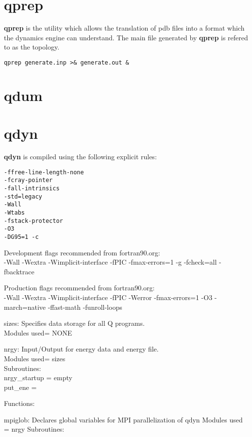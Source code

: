 \documentclass[10pt, oneside, pdftex]{article}
\begin{document}
\section{qprep}
\label{qprep}
\textbf{qprep} is the utility which allows the translation of pdb files into
a format which the dynamics engine can understand. The main file generated
by \textbf{qprep} is refered to as the topology.

\lstset{language=sh, frame=single}
\begin{Verbatim}
qprep generate.inp >& generate.out &
\end{Verbatim}


\section{qdum}
\label{qdum}


\section{qdyn}
\label{qdyn}
\textbf{qdyn} is compiled using the following explicit rules:
\begin{Verbatim}
-ffree-line-length-none
-fcray-pointer
-fall-intrinsics
-std=legacy
-Wall
-Wtabs
-fstack-protector
-O3
-DG95=1 -c
\end{Verbatim}

Development flags recommended from fortran90.org:\\
-Wall -Wextra -Wimplicit-interface -fPIC -fmax-errors=1 -g -fcheck=all -fbacktrace

Production flags recommended from fortran90.org:\\
-Wall -Wextra -Wimplicit-interface -fPIC -Werror -fmax-errors=1 -O3 -march=native -ffast-math -funroll-loops

sizes: Specifies data storage for all Q programs.\\
Modules used= NONE

nrgy: Input/Output for energy data and energy file.\\
Modules used= sizes\\
Subroutines:\\
  nrgy\_startup = empty\\
  put\_ene =

Functions:

mpiglob: Declares global variables for MPI parallelization of qdyn
Modules used = nrgy
Subroutines:
\end{document}
